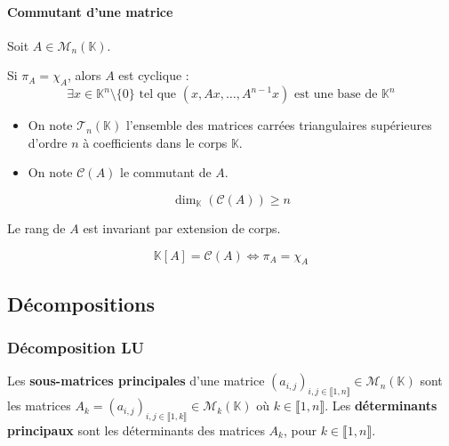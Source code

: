 	\paragraph{Commutant d'une matrice}
	
	Soit $A \in \mathcal{M}_n(\mathbb{K})$.
	
	
	\begin{lemma}
		Si $\pi_A = \chi_A$, alors $A$ est cyclique :
		\[ \exists x \in \mathbb{K}^n \setminus \{ 0 \} \text{ tel que } (x, Ax, \dots, A^{n-1}x) \text{ est une base de } \mathbb{K}^n \]
	\end{lemma}
	
	
	\begin{notation}
		\begin{itemize}
			\item On note $\mathcal{T}_n(\mathbb{K})$ l'ensemble des matrices carrées triangulaires supérieures d'ordre $n$ à coefficients dans le corps $\mathbb{K}$.
			\item On note $\mathcal{C}(A)$ le commutant de $A$.
		\end{itemize}
	\end{notation}
	
	\begin{lemma}
		\[ \dim_{\mathbb{K}}(\mathcal{C}(A)) \geq n \]
	\end{lemma}
	
	\begin{lemma}
		Le rang de $A$ est invariant par extension de corps.
	\end{lemma}
	
	
	\begin{theorem}
		\[ \mathbb{K}[A] = \mathcal{C}(A) \iff \pi_A = \chi_A \]
	\end{theorem}
	
	\subsection{Décompositions}
	
	\subsubsection{Décomposition LU}
	
	
	\begin{definition}
		Les \textbf{sous-matrices principales} d'une matrice $(a_{i,j})_{i,j \in \llbracket 1, n \rrbracket} \in \mathcal{M}_n(\mathbb{K})$ sont les matrices $A_k = (a_{i,j})_{i,j \in \llbracket 1, k \rrbracket} \in \mathcal{M}_k(\mathbb{K})$ où $k \in \llbracket 1, n \rrbracket$. Les \textbf{déterminants principaux} sont les déterminants des matrices $A_k$, pour $k \in \llbracket 1, n \rrbracket$.
	\end{definition}
	
